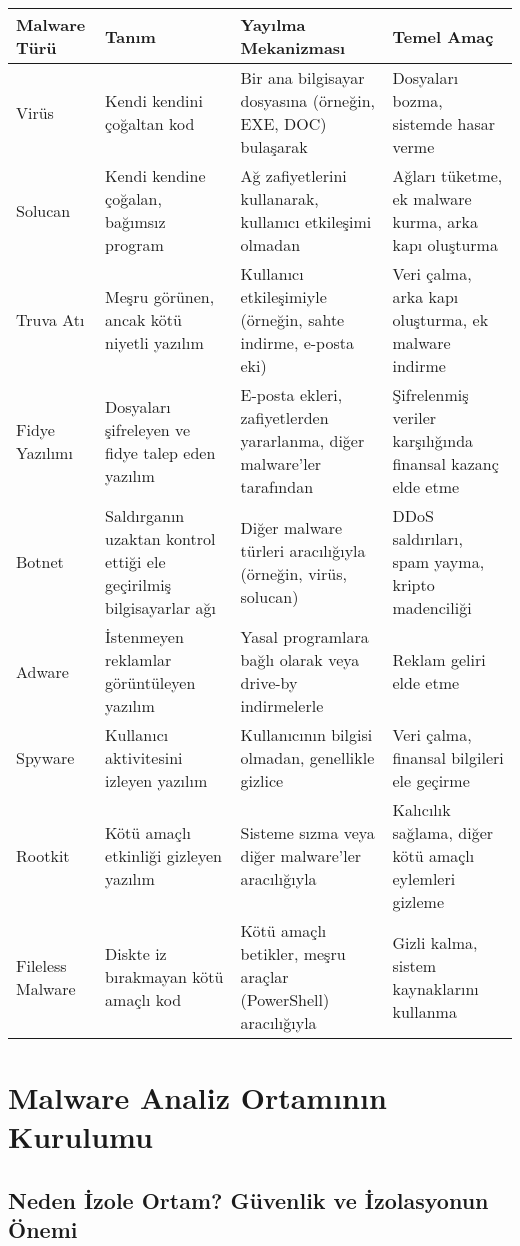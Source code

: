 \begin{longtable}{|l|p{3cm}|p{3.5cm}|p{3.5cm}|}
\hline
\textbf{Malware Türü} & \textbf{Tanım} & \textbf{Yayılma Mekanizması} & \textbf{Temel Amaç} \\
\hline
Virüs & Kendi kendini çoğaltan kod & Bir ana bilgisayar dosyasına (örneğin, EXE, DOC) bulaşarak & Dosyaları bozma, sistemde hasar verme \\
\hline
Solucan & Kendi kendine çoğalan, bağımsız program & Ağ zafiyetlerini kullanarak, kullanıcı etkileşimi olmadan & Ağları tüketme, ek malware kurma, arka kapı oluşturma \\
\hline
Truva Atı & Meşru görünen, ancak kötü niyetli yazılım & Kullanıcı etkileşimiyle (örneğin, sahte indirme, e-posta eki) & Veri çalma, arka kapı oluşturma, ek malware indirme \\
\hline
Fidye Yazılımı & Dosyaları şifreleyen ve fidye talep eden yazılım & E-posta ekleri, zafiyetlerden yararlanma, diğer malware'ler tarafından & Şifrelenmiş veriler karşılığında finansal kazanç elde etme \\
\hline
Botnet & Saldırganın uzaktan kontrol ettiği ele geçirilmiş bilgisayarlar ağı & Diğer malware türleri aracılığıyla (örneğin, virüs, solucan) & DDoS saldırıları, spam yayma, kripto madenciliği \\
\hline
Adware & İstenmeyen reklamlar görüntüleyen yazılım & Yasal programlara bağlı olarak veya drive-by indirmelerle & Reklam geliri elde etme \\
\hline
Spyware & Kullanıcı aktivitesini izleyen yazılım & Kullanıcının bilgisi olmadan, genellikle gizlice & Veri çalma, finansal bilgileri ele geçirme \\
\hline
Rootkit & Kötü amaçlı etkinliği gizleyen yazılım & Sisteme sızma veya diğer malware'ler aracılığıyla & Kalıcılık sağlama, diğer kötü amaçlı eylemleri gizleme \\
\hline
Fileless Malware & Diskte iz bırakmayan kötü amaçlı kod & Kötü amaçlı betikler, meşru araçlar (PowerShell) aracılığıyla & Gizli kalma, sistem kaynaklarını kullanma \\
\hline
\end{longtable}

\section{Malware Analiz Ortamının Kurulumu}

\subsection{Neden İzole Ortam? Güvenlik ve İzolasyonun Önemi}

